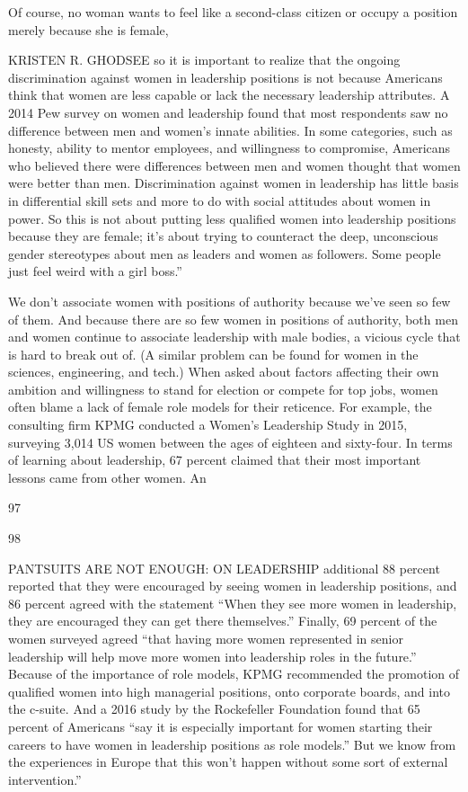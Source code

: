  \par 
Of course, no woman wants to feel like a second-class citizen or occupy a position merely because she is female,
 \par 
KRISTEN R. GHODSEE so it is important to realize that the ongoing discrimination against women in leadership positions is not because Americans think that women are less capable or lack the necessary leadership attributes. A 2014 Pew survey on women and leadership found that most respondents saw no difference between men and women’s innate abilities. In some categories, such as honesty, ability to mentor employees, and willingness to compromise, Americans who believed there were differences between men and women thought that women were better than men. Discrimination against women in leadership has little basis in differential skill sets and more to do with social attitudes about women in power. So this is not about putting less qualified women into leadership positions because they are female; it’s about trying to counteract the deep, unconscious gender stereotypes about men as leaders and women as followers. Some people just feel weird with a girl boss.”
 \par 
We don’t associate women with positions of authority because we’ve seen so few of them. And because there are so few women in positions of authority, both men and women continue to associate leadership with male bodies, a vicious cycle that is hard to break out of. (A similar problem can be found for women in the sciences, engineering, and tech.) When asked about factors affecting their own ambition and willingness to stand for election or compete for top jobs, women often blame a lack of female role models for their reticence. For example, the consulting firm KPMG conducted a Women’s Leadership Study in 2015, surveying 3,014 US women between the ages of eighteen and sixty-four. In terms of learning about leadership, {\color{blue}67} percent claimed that their most important lessons came from other women. An
 \par 
97
 \par 
98
 \par 
PANTSUITS ARE NOT ENOUGH: ON LEADERSHIP additional {\color{blue}88} percent reported that they were encouraged by seeing women in leadership positions, and {\color{blue}86} percent agreed with the statement “When they see more women in leadership, they are encouraged they can get there themselves.” Finally, {\color{blue}69} percent of the women surveyed agreed “that having more women represented in senior leadership will help move more women into leadership roles in the future.” Because of the importance of role models, KPMG recommended the promotion of qualified women into high managerial positions, onto corporate boards, and into the c-suite. And a 2016 study by the Rockefeller Foundation found that {\color{blue}65} percent of Americans “say it is especially important for women starting their careers to have women in leadership positions as role models.” But we know from the experiences in Europe that this won’t happen without some sort of external intervention.”
